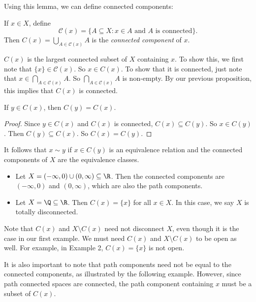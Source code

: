 \documentclass[a4paper]{article}
\begin{document}
Using this lemma, we can define connected components:

\begin{defi}
  If $x\in X$, define
  \[
    \mathcal{C}(x) = \{A\subseteq X: x\in A\text{ and }A\text{ is connected}\}.
  \]
  Then $\displaystyle C(x) = \bigcup_{A\in \mathcal{C}(x)} A$ is the \emph{connected component} of $x$.
\end{defi}
$C(x)$ is the largest connected subset of $X$ containing $x$. To show this, we first note that $\{x\}\in \mathcal{C}(x)$. So $x\in C(x)$. To show that it is connected, just note that $x\in \bigcap_{A\in \mathcal{C}(x)}A$. So $\bigcap_{A\in \mathcal{C}(x)}A$ is non-empty. By our previous proposition, this implies that $C(x)$ is connected.

\begin{lemma}
  If $y\in C(x)$, then $C(y) = C(x)$.
\end{lemma}

\begin{proof}
  Since $y\in C(x)$ and $C(x)$ is connected, $C(x) \subseteq C(y)$. So $x\in C(y)$. Then $C(y)\subseteq C(x)$. So $C(x) = C(y)$.
\end{proof}

It follows that $x\sim y$ if $x \in C(y)$ is an equivalence relation and the connected components of $X$ are the equivalence classes.

\begin{eg}\leavevmode
  \begin{itemize}
    \item Let $X = (-\infty, 0) \cup (0, \infty)\subseteq \R$. Then the connected components are $(-\infty, 0)$ and $(0, \infty)$, which are also the path components.
    \item Let $X = \Q\subseteq \R$. Then $C(x) = \{x\}$ for all $x\in X$. In this case, we say $X$ is totally disconnected.
  \end{itemize}
\end{eg}
Note that $C(x)$ and $X\setminus C(x)$ need not disconnect $X$, even though it is the case in our first example. We must need $C(x)$ and $X\setminus C(x)$ to be open as well. For example, in Example 2, $C(x) = \{x\}$ is not open.

It is also important to note that path components need not be equal to the connected components, as illustrated by the following example. However, since path connected spaces are connected, the path component containing $x$ must be a subset of $C(x)$.
\end{document}
